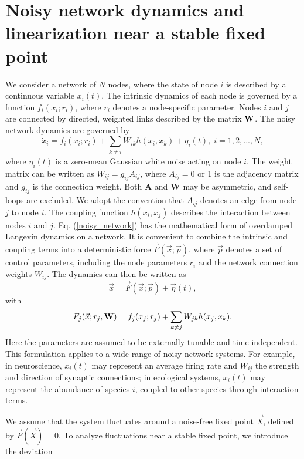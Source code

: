 \section{Noisy network dynamics and linearization near a stable fixed point}
\quad We consider a network of $N$ nodes, where the state of node $i$ is described by a continuous variable $x_i(t)$. The intrinsic dynamics of each node is governed by a function $f_i(x_i;r_i)$, where $r_i$ denotes a node-specific parameter. Nodes $i$ and $j$ are connected by directed, weighted links described by the matrix ${\bf W}$. The noisy network dynamics are governed by
\begin{equation}
    \dot{x}_i = f_i(x_i;r_i) + \sum_{k\neq i} W_{ik} h(x_i, x_k) + \eta_i(t),\;i=1,2,...,N,
    \label{noisy_network}
\end{equation}
where $\eta_i(t)$ is a zero-mean Gaussian white noise acting on node $i$. The weight matrix can be written as $W_{ij}=g_{ij}A_{ij}$, where $A_{ij}=0$ or 1 is the adjacency matrix and $g_{ij}$ is the connection weight. Both $\mathbf{A}$ and $\mathbf{W}$ may be asymmetric, and self-loops are excluded. We adopt the convention that $A_{ij}$ denotes an edge from node $j$ to node $i$. The coupling function $h(x_i,x_j)$ describes the interaction between nodes $i$ and $j$. Eq. (\ref{noisy_network}) has the mathematical form of overdamped Langevin dynamics on a network. It is convenient to combine the intrinsic and coupling terms into a deterministic force $\vec{F}(\vec{x};\vec{p})$, where $\vec{p}$ denotes a set of control parameters, including the node parameters $r_i$ and the network connection weights $W_{ij}$. The dynamics can then be written as
\begin{equation}
    \dot{\vec{x}} = \vec{F}(\vec{x};\vec{p}) + \vec{\eta}(t),
    \label{deterministic_force}
\end{equation}
with
\begin{equation}
    F_j(\vec{x}; r_j, {\bf W}) = f_j(x_j;r_j) + \sum_{k\neq j} W_{jk} h(x_j,x_k).
\end{equation}
Here the parameters are assumed to be externally tunable and time-independent. This formulation applies to a wide range of noisy network systems. For example, in neuroscience, $x_i(t)$ may represent an average firing rate and $W_{ij}$ the strength and direction of synaptic connections; in ecological systems, $x_i(t)$ may represent the abundance of species $i$, coupled to other species through interaction terms.\par
We assume that the system fluctuates around a noise-free fixed point $\vec{X}$, defined by $\vec{F}(\vec{X}) = 0$. To analyze fluctuations near a stable fixed point, we introduce the deviation
